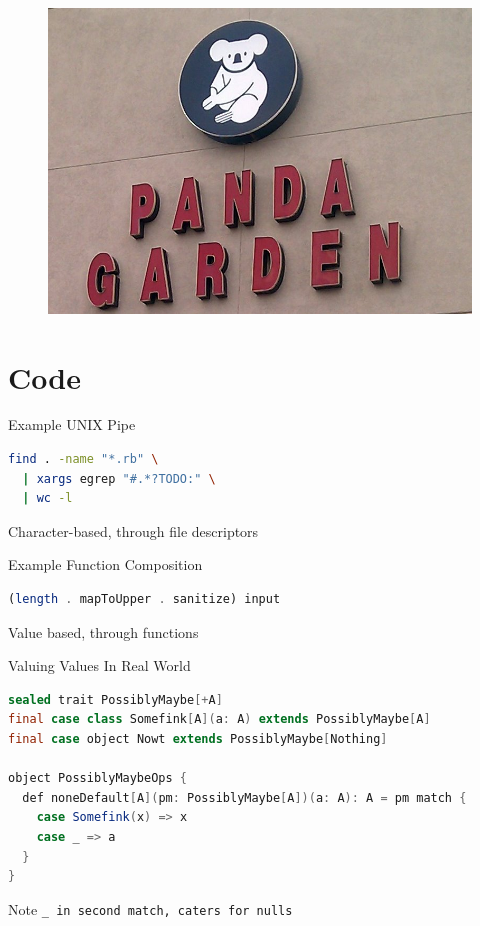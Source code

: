 \documentclass[compress]{beamer}
\begin{document}
\begin{frame}
  \begin{figure}
    \centering
    \includegraphics[width=\linewidth]{assets/panda_garden_fail.jpg}
  \end{figure}
\end{frame}

\section{Code}

\begin{frame}[containsverbatim]{Example UNIX Pipe}
\begin{lstlisting}[language=bash]
find . -name "*.rb" \
  | xargs egrep "#.*?TODO:" \
  | wc -l
\end{lstlisting}
  \small{Character-based, through file descriptors}
\end{frame}

\begin{frame}[containsverbatim]{Example Function Composition}
\begin{lstlisting}[language=haskell]
(length . mapToUpper . sanitize) input
\end{lstlisting}
  \small{Value based, through functions}
\end{frame}

\begin{frame}[containsverbatim]{Valuing Values In Real World}
\begin{lstlisting}[language=java]
sealed trait PossiblyMaybe[+A]
final case class Somefink[A](a: A) extends PossiblyMaybe[A]
final case object Nowt extends PossiblyMaybe[Nothing]

object PossiblyMaybeOps {
  def noneDefault[A](pm: PossiblyMaybe[A])(a: A): A = pm match {
    case Somefink(x) => x
    case _ => a
  }
}
\end{lstlisting}
  \small{Note \tt{\_} in second match, caters for \tt{null}s}
\end{frame}
\end{document}

